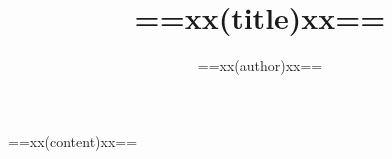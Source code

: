 \documentclass[geye, normal, black]{elegantnote}
\title{==xx(title)xx==}
\author{==xx(author)xx==}
\date{}
\begin{document}
    \maketitle

    ==xx(content)xx==
\end{document}
